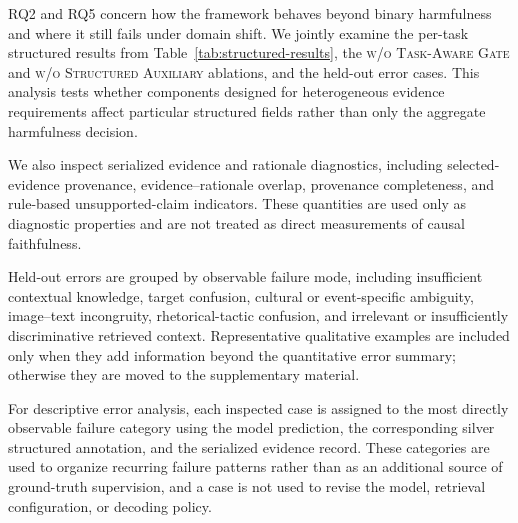 RQ2 and RQ5 concern how the framework behaves beyond binary harmfulness and
where it still fails under domain shift.
We jointly examine the per-task structured results from
Table~\ref{tab:structured-results}, the
\textsc{w/o Task-Aware Gate} and
\textsc{w/o Structured Auxiliary} ablations, and the held-out error cases.
This analysis tests whether components designed for heterogeneous evidence
requirements affect particular structured fields rather than only the
aggregate harmfulness decision.

We also inspect serialized evidence and rationale diagnostics, including
selected-evidence provenance, evidence--rationale overlap, provenance
completeness, and rule-based unsupported-claim indicators.
These quantities are used only as diagnostic properties and are not treated
as direct measurements of causal faithfulness.

Held-out errors are grouped by observable failure mode, including
insufficient contextual knowledge, target confusion, cultural or
event-specific ambiguity, image--text incongruity, rhetorical-tactic
confusion, and irrelevant or insufficiently discriminative retrieved
context.
Representative qualitative examples are included only when they add
information beyond the quantitative error summary; otherwise they are moved
to the supplementary material.

For descriptive error analysis, each inspected case is assigned to the most
directly observable failure category using the model prediction, the
corresponding silver structured annotation, and the serialized evidence
record.
These categories are used to organize recurring failure patterns rather than
as an additional source of ground-truth supervision, and a case is not used
to revise the model, retrieval configuration, or decoding policy.


